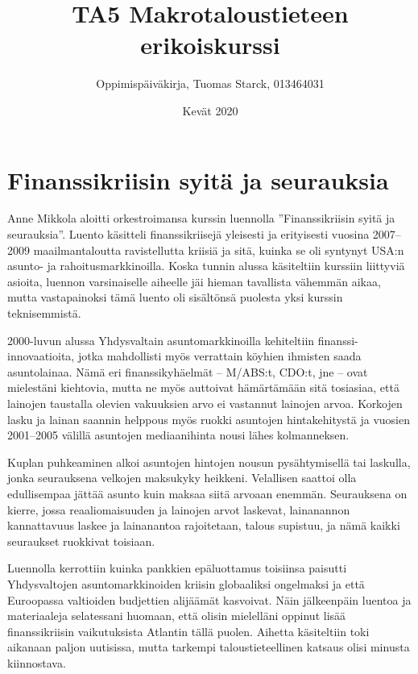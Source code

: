 \documentclass[12pt]{article}
\begin{document}
\title{TA5 Makrotaloustieteen erikoiskurssi}
\author{Oppimispäiväkirja, Tuomas Starck, 013464031}
\date{Kevät 2020}
\maketitle

\newpage
\section{Finanssikriisin syitä ja seurauksia}

Anne Mikkola aloitti orkestroimansa kurssin luennolla ''Finanssikriisin syitä ja seurauksia''. Luento käsitteli finanssikriisejä yleisesti ja erityisesti vuosina 2007–2009 maailmantaloutta ravistellutta kriisiä ja sitä, kuinka se oli syntynyt USA:n asunto- ja rahoitusmarkkinoilla. Koska tunnin alussa käsiteltiin kurssiin liittyviä asioita, luennon varsinaiselle aiheelle jäi hieman tavallista vähemmän aikaa, mutta vastapainoksi tämä luento oli sisältönsä puolesta yksi kurssin teknisemmistä.

2000-luvun alussa Yhdysvaltain asuntomarkkinoilla kehiteltiin finanssi-innovaatioita, jotka mahdollisti myös verrattain köyhien ihmisten saada asuntolainaa. Nämä eri finanssikyhäelmät – M/ABS:t, CDO:t, jne – ovat mielestäni kiehtovia, mutta ne myös auttoivat hämärtämään sitä tosiasiaa, että lainojen taustalla olevien vakuuksien arvo ei vastannut lainojen arvoa. Korkojen lasku ja lainan saannin helppous myös ruokki asuntojen hintakehitystä ja vuosien 2001–2005 välillä asuntojen mediaanihinta nousi lähes kolmanneksen.

Kuplan puhkeaminen alkoi asuntojen hintojen nousun pysähtymisellä tai laskulla, jonka seurauksena velkojen maksukyky heikkeni. Velallisen saattoi olla edullisempaa jättää asunto kuin maksaa siitä arvoaan enemmän. Seurauksena on kierre, jossa reaaliomaisuuden ja lainojen arvot laskevat, lainanannon kannattavuus laskee ja lainanantoa rajoitetaan, talous supistuu, ja nämä kaikki seuraukset ruokkivat toisiaan.

Luennolla kerrottiin kuinka pankkien epäluottamus toisiinsa paisutti Yhdysvaltojen asuntomarkkinoiden kriisin globaaliksi ongelmaksi ja että Euroopassa valtioiden budjettien alijäämät kasvoivat. Näin jälkeenpäin luentoa ja materiaaleja selatessani huomaan, että olisin mielelläni oppinut lisää finanssikriisin vaikutuksista Atlantin tällä puolen. Aihetta käsiteltiin toki aikanaan paljon uutisissa, mutta tarkempi taloustieteellinen katsaus olisi minusta kiinnostava.
\end{document}
